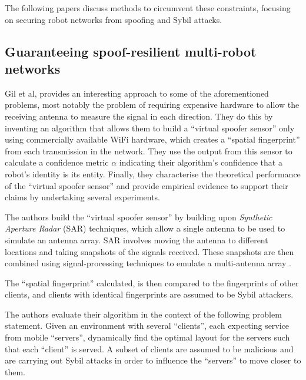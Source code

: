 The following papers discuss methods to circumvent these constraints, focusing on securing robot networks from spoofing and Sybil attacks. 

\subsection{Guaranteeing spoof-resilient multi-robot networks}
Gil et al, \cite{GuaranteeingSpoofResilience} provides an interesting approach to some of the aforementioned problems, most notably the problem of requiring expensive hardware to allow the receiving antenna to measure the signal in each direction. They do this by inventing an algorithm that allows them to build a ``virtual spoofer sensor'' only using commercially available WiFi hardware, which creates a ``spatial fingerprint'' from each transmission in the network. They use the output from this sensor to calculate a confidence metric $\alpha$ indicating their algorithm's confidence that a robot's identity is its entity. Finally, they characterise the theoretical performance of the ``virtual spoofer sensor'' and provide empirical evidence to support their claims by undertaking several experiments.

The authors build the ``virtual spoofer sensor'' by building upon \textit{Synthetic Aperture Radar} (SAR) techniques, which allow a single antenna to be used to simulate an antenna array. SAR involves moving the antenna to different locations and taking snapshots of the signals received. These snapshots are then combined using signal-processing techniques to emulate a multi-antenna array \cite{BAD_SAR}.

The ``spatial fingerprint'' calculated, is then compared to the fingerprints of other clients, and clients with identical fingerprints are assumed to be Sybil attackers.

The authors evaluate their algorithm in the context of the following problem statement. Given an environment with several ``clients'', each expecting service from mobile ``servers'', dynamically find the optimal layout for the servers such that each ``client'' is served. A subset of clients are assumed to be malicious and are carrying out Sybil attacks in order to influence the ``servers'' to move closer to them.

